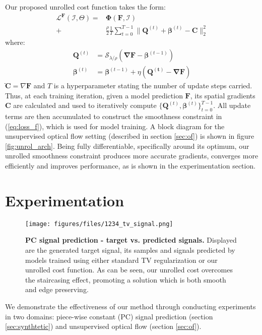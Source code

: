 \documentclass[10pt,twocolumn,letterpaper]{article}
\begin{document}
Our proposed unrolled cost function takes the form:
\begin{equation}
\begin{aligned}
    \mathcal{L}^{\mathbf{F}}(\mathcal{I},\Theta)=&\mathbf{\Phi}\left( \mathbf{F},\mathcal{I} \right) \\
    +&\frac{\rho}{2} \frac{1}{T} \sum_{t=0}^{T-1} \|\mathbf{Q}^{(t)} + \boldsymbol{\beta}^{(t)} - \mathbf{C} \|_2^2 \label{eq:loss_f}
\end{aligned}
\end{equation}
where:
\begin{subequations} 
\begin{align}
    \mathbf{Q}^{(t)}&=\mathcal{S}_{\lambda/\rho} \left( \mathbf{\nabla F}-\boldsymbol{\beta}^{(t-1)} \right) \label{eq:update_q} \\ 
    \boldsymbol{\beta}^{(t)}&= \boldsymbol{\beta}^{(t-1)} + \eta \mathbf{\left( Q^{(t)} - \nabla F \right)} \label{eq:update_b}
\end{align}
\end{subequations}
$ֿ\mathbf{C} =\nabla\mathbf{F}$ and $T$ is a hyperparameter stating the number of update steps carried. Thus, at each training iteration, given a model prediction $\mathbf{F}$, its spatial gradients $\mathbf{C}$ are calculated and used to iteratively compute $\{\mathbf{Q}^{(t)},\boldsymbol{\beta}^{(t)}\}_{t=0}^{T-1}$. All update terms are then accumulated to construct the smoothness constraint in (\ref{eq:loss_f}), which is used for model training. 
A block diagram for the unsupervised optical flow setting (described in section \ref{sec:of}) is shown in figure \ref{fig:unrol_arch}. Being fully differentiable, specifically around its optimum, our unrolled smoothness constraint produces more accurate  gradients, converges more efficiently and improves performance, as is shown in the experimentation section. \section{Experimentation}
\begin{figure}
\begin{center}
\texttt{[image: figures/files/1234\_tv\_signal.png]}
\end{center}
   \caption{\textbf{PC signal prediction - target vs. predicted signals.}
   Displayed are the generated target signal, its samples and signals predicted by models trained using either standard TV regularization or our unrolled cost function. As can be seen, our unrolled cost overcomes the staircasing effect, promoting a solution which is both smooth and edge preserving.}
\label{fig:toy_sigs}
\end{figure} We demonstrate the effectiveness of our method through conducting experiments in two domains: piece-wise constant (PC) signal prediction (section \ref{sec:synthtetic}) and unsupervised optical flow (section \ref{sec:of}). 
\end{document}
